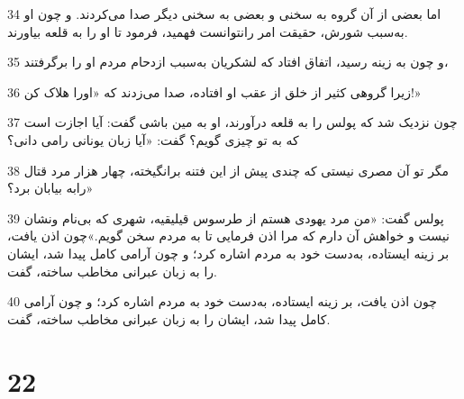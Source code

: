 \par 34 اما بعضی از آن گروه به سخنی و بعضی به سخنی دیگر صدا می‌کردند. و چون او به‌سبب شورش، حقیقت امر رانتوانست فهمید، فرمود تا او را به قلعه بیاورند.
\par 35 و چون به زینه رسید، اتفاق افتاد که لشکریان به‌سبب ازدحام مردم او را برگرفتند،
\par 36 زیرا گروهی کثیر از خلق از عقب او افتاده، صدا می‌زدند که «اورا هلاک کن!»
\par 37 چون نزدیک شد که پولس را به قلعه درآورند، او به مین باشی گفت: آیا اجازت است که به تو چیزی گویم؟ گفت: «آیا زبان یونانی رامی دانی؟
\par 38 مگر تو آن مصری نیستی که چندی پیش از این فتنه برانگیخته، چهار هزار مرد قتال رابه بیابان برد؟»
\par 39 پولس گفت: «من مرد یهودی هستم از طرسوس قیلیقیه، شهری که بی‌نام ونشان نیست و خواهش آن دارم که مرا اذن فرمایی تا به مردم سخن گویم.»چون اذن یافت، بر زینه ایستاده، به‌دست خود به مردم اشاره کرد؛ و چون آرامی کامل پیدا شد، ایشان را به زبان عبرانی مخاطب ساخته، گفت.
\par 40 چون اذن یافت، بر زینه ایستاده، به‌دست خود به مردم اشاره کرد؛ و چون آرامی کامل پیدا شد، ایشان را به زبان عبرانی مخاطب ساخته، گفت.

\chapter{22}

